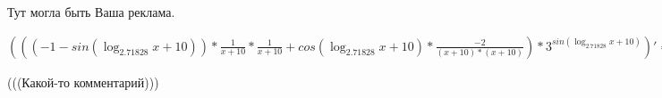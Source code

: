 \documentclass[12pt,a4paper,fleqn]{article}
\theoremstyle{definition}
\begin{document}
Тут могла быть Ваша реклама.

$((( -1  - sin(\log_{ 2.71828 }{ x  +  10 })) * \frac{ 1 }{ x  +  10 }
 * \frac{ 1 }{ x  +  10 }
 + cos(\log_{ 2.71828 }{ x  +  10 }) * \frac{ -2 }{( x  +  10 ) * ( x  +  10 )}
) * { 3 }^{sin(\log_{ 2.71828 }{ x  +  10 })})' = ((( 0  - cos(\log_{ 2.71828 }{ x  +  10 }) * \frac{ 1  +  0 }{\log_{ 2.71828 }{ 2.71828 } * ( x  +  10 )}
) * \frac{ 1 }{ x  +  10 }
 + ( -1  - sin(\log_{ 2.71828 }{ x  +  10 })) * \frac{ 0  * ( x  +  10 ) -  1  * ( 1  +  0 )}{( x  +  10 ) * ( x  +  10 )}
) * \frac{ 1 }{ x  +  10 }
 + ( -1  - sin(\log_{ 2.71828 }{ x  +  10 })) * \frac{ 1 }{ x  +  10 }
 * \frac{ 0  * ( x  +  10 ) -  1  * ( 1  +  0 )}{( x  +  10 ) * ( x  +  10 )}
 + ( -1  - sin(\log_{ 2.71828 }{ x  +  10 })) * \frac{ 1  +  0 }{\log_{ 2.71828 }{ 2.71828 } * ( x  +  10 )}
 * \frac{ -2 }{( x  +  10 ) * ( x  +  10 )}
 + cos(\log_{ 2.71828 }{ x  +  10 }) * \frac{ 0  * ( x  +  10 ) * ( x  +  10 ) -  -2  * (( 1  +  0 ) * ( x  +  10 ) + ( x  +  10 ) * ( 1  +  0 ))}{( x  +  10 ) * ( x  +  10 ) * ( x  +  10 ) * ( x  +  10 )}
) * { 3 }^{sin(\log_{ 2.71828 }{ x  +  10 })} + (( -1  - sin(\log_{ 2.71828 }{ x  +  10 })) * \frac{ 1 }{ x  +  10 }
 * \frac{ 1 }{ x  +  10 }
 + cos(\log_{ 2.71828 }{ x  +  10 }) * \frac{ -2 }{( x  +  10 ) * ( x  +  10 )}
) * \log_{ 2.71828 }{ 3 } * cos(\log_{ 2.71828 }{ x  +  10 }) * \frac{ 1  +  0 }{\log_{ 2.71828 }{ 2.71828 } * ( x  +  10 )}
 * { 3 }^{sin(\log_{ 2.71828 }{ x  +  10 })}$

(((Какой-то комментарий)))
\end{document}

